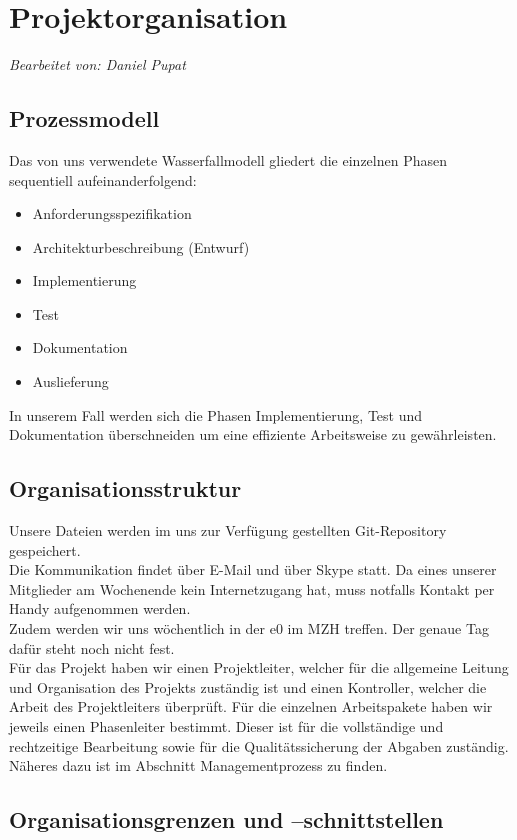 \section{Projektorganisation}
\textit{Bearbeitet von: Daniel Pupat}
\subsection{Prozessmodell}
\label{sec:prozessmodell}

Das von uns verwendete Wasserfallmodell gliedert die einzelnen Phasen sequentiell aufeinanderfolgend:\\
\begin{itemize}
\item Anforderungsspezifikation
\item Architekturbeschreibung (Entwurf)
\item Implementierung
\item Test
\item Dokumentation
\item Auslieferung
\end{itemize}
In unserem Fall werden sich die Phasen Implementierung, Test und Dokumentation überschneiden um eine effiziente Arbeitsweise zu gewährleisten.

\subsection{Organisationsstruktur}

Unsere Dateien werden im uns zur Verfügung gestellten Git-Repository gespeichert.\\
Die Kommunikation findet über E-Mail und über Skype statt. Da eines unserer Mitglieder am Wochenende kein Internetzugang hat, muss notfalls Kontakt per Handy aufgenommen werden. \\ 
Zudem werden wir uns wöchentlich in der e0 im MZH treffen. Der genaue Tag dafür steht noch nicht fest.\\ 
Für das Projekt haben wir einen Projektleiter, welcher für die allgemeine Leitung und Organisation des Projekts zuständig ist und einen Kontroller, welcher die Arbeit des Projektleiters überprüft. Für die einzelnen Arbeitspakete haben wir jeweils einen Phasenleiter bestimmt. Dieser ist für die vollständige und rechtzeitige Bearbeitung sowie für die Qualitätssicherung der Abgaben zuständig. Näheres dazu ist im Abschnitt Managementprozess zu finden.

\subsection{Organisationsgrenzen und --schnittstellen}


